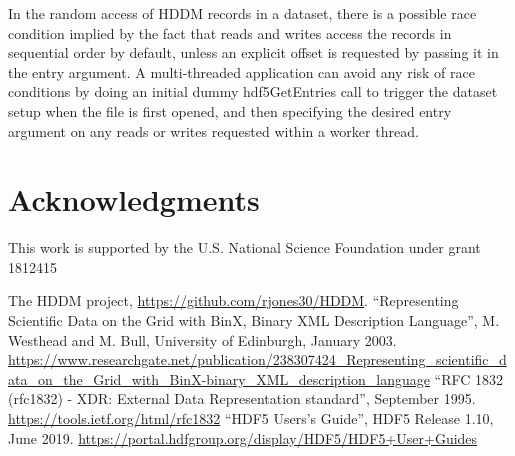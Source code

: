 \documentclass{revtex4}
\begin{document}
In the random access of HDDM records in a dataset, there is a
possible race condition implied by the fact that reads and writes access the
records in sequential order by default, unless an explicit offset is requested
by passing it in the entry argument. A multi-threaded application can avoid any
risk of race conditions by doing an initial dummy hdf5GetEntries call to 
trigger the dataset setup when the file is first opened, and then specifying
the desired entry argument on any reads or writes requested within a worker thread.

\section*{Acknowledgments}

This work is supported by the U.S. National Science Foundation under grant 1812415

\begin{thebibliography}{d}
The HDDM project, \url{https://github.com/rjones30/HDDM}.
``Representing Scientific Data on the Grid with BinX, Binary XML Description
Language'', M. Westhead and M. Bull, University of Edinburgh, January 2003.
\url{https://www.researchgate.net/publication/238307424_Representing_scientific_data_on_the_Grid_with_BinX-binary_XML_description_language}
``RFC 1832 (rfc1832) - XDR: External Data Representation standard'',
September 1995.
\url{https://tools.ietf.org/html/rfc1832}
``HDF5 Users's Guide'', HDF5 Release 1.10, June 2019.
\url{https://portal.hdfgroup.org/display/HDF5/HDF5+User+Guides}
\end{thebibliography}
\end{document}
